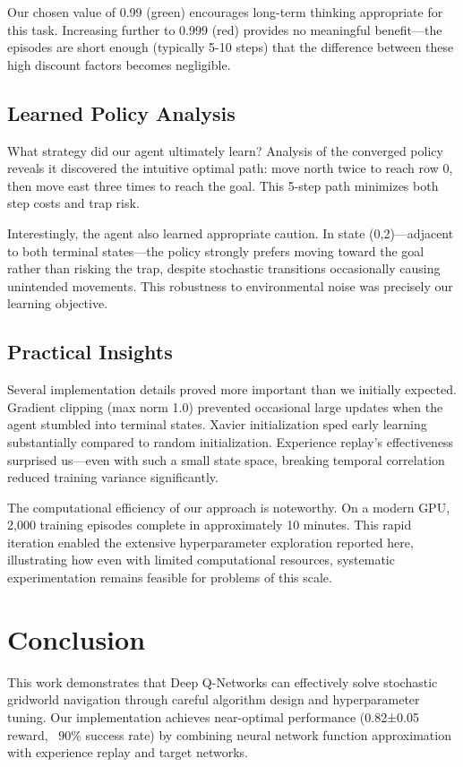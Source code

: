 \documentclass[conference]{IEEEtran}
\begin{document}
Our chosen value of 0.99 (green) encourages long-term thinking appropriate for this task. Increasing further to 0.999 (red) provides no meaningful benefit—the episodes are short enough (typically 5-10 steps) that the difference between these high discount factors becomes negligible.

\subsection{Learned Policy Analysis}

What strategy did our agent ultimately learn? Analysis of the converged policy reveals it discovered the intuitive optimal path: move north twice to reach row 0, then move east three times to reach the goal. This 5-step path minimizes both step costs and trap risk.

Interestingly, the agent also learned appropriate caution. In state (0,2)—adjacent to both terminal states—the policy strongly prefers moving toward the goal rather than risking the trap, despite stochastic transitions occasionally causing unintended movements. This robustness to environmental noise was precisely our learning objective.

\subsection{Practical Insights}

Several implementation details proved more important than we initially expected. Gradient clipping (max norm 1.0) prevented occasional large updates when the agent stumbled into terminal states. Xavier initialization sped early learning substantially compared to random initialization. Experience replay's effectiveness surprised us—even with such a small state space, breaking temporal correlation reduced training variance significantly.

The computational efficiency of our approach is noteworthy. On a modern GPU, 2,000 training episodes complete in approximately 10 minutes. This rapid iteration enabled the extensive hyperparameter exploration reported here, illustrating how even with limited computational resources, systematic experimentation remains feasible for problems of this scale.

\section{Conclusion}

This work demonstrates that Deep Q-Networks can effectively solve stochastic gridworld navigation through careful algorithm design and hyperparameter tuning. Our implementation achieves near-optimal performance (0.82±0.05 reward, ~90\% success rate) by combining neural network function approximation with experience replay and target networks.
\end{document}
